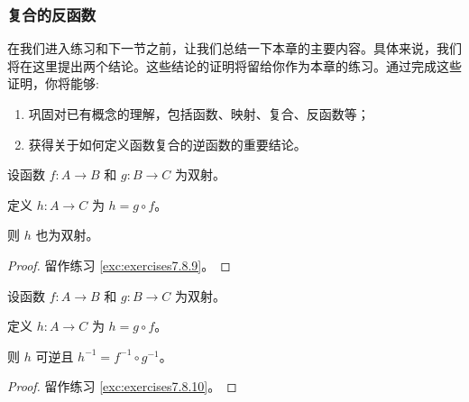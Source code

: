 \subsubsection*{复合的反函数}

在我们进入练习和下一节之前，让我们总结一下本章的主要内容。具体来说，我们将在这里提出两个结论。这些结论的证明将留给你作为本章的练习。通过完成这些证明，你将能够:
\begin{enumerate}[label=(\alph*)]
    \item 巩固对已有概念的理解，包括函数、映射、复合、反函数等；
    \item 获得关于如何定义函数复合的逆函数的重要结论。
\end{enumerate}

\begin{proposition}
    设函数 $f : A \to B$ 和 $g : B \to C$ 为双射。

    定义 $h : A \to C$ 为 $h = g \circ f$。
    
    则 $h$ 也为双射。
\end{proposition}

\begin{proof}
    留作练习 \ref{exc:exercises7.8.9}。
\end{proof}

\begin{proposition}
    设函数 $f : A \to B$ 和 $g : B \to C$ 为双射。

    定义 $h : A \to C$ 为 $h = g \circ f$。
    
    则 $h$ 可逆且 $h^{-1} = f^{-1} \circ g^{-1}$。
\end{proposition}

\begin{proof}
    留作练习 \ref{exc:exercises7.8.10}。
\end{proof}